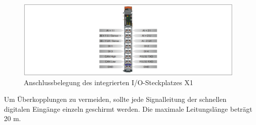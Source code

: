 \documentclass[10pt,a4paper]{report}
\begin{document}
	\begin{figure}[htb]
		\includegraphics[width=1\textwidth]{H1}
		\centering
		\caption{Anschlussbelegung des integrierten I/O-Steckplatzes X1}
	\end{figure}
	
	Um Überkopplungen zu vermeiden, sollte jede Signalleitung der schnellen digitalen Eingänge einzeln geschirmt
	werden. Die maximale Leitungslänge beträgt 20 m.
	
\end{document}
